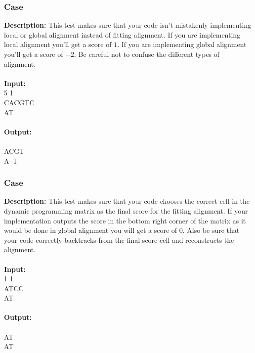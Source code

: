 \documentclass{article}
\newcommand{\code}[1]{{\fontfamily{pcr}\selectfont #1}}
\begin{document}
\subsubsection*{Case }
\hline \vspace{5}
\textbf{Description:} This test makes sure that your code isn’t mistakenly implementing local or global alignment instead of fitting alignment. If you are implementing local alignment you’ll get a score of $1$. If you are implementing global alignment you’ll get a score of $-2$. Be careful not to confuse the different types of alignment.\\ \\
\noindent \textbf{Input:}\\
\code{1 5 1\\CACGTC\\AT}\\ \\
\noindent \textbf{Output:}\\
\code{0\\ACGT\\A--T}

\subsubsection*{Case }
\hline \vspace{5}
\textbf{Description:} This test makes sure that your code chooses the correct cell in the dynamic programming matrix as the final score for the fitting alignment. If your implementation outputs the score in the bottom right corner of the matrix as it would be done in global alignment you will get a score of $0$. Also be sure that your code correctly backtracks from the final score cell and reconstructs the alignment.\\ \\
\noindent \textbf{Input:}\\
\code{1 1 1\\ATCC\\AT}\\ \\
\noindent \textbf{Output:}\\
\code{2\\AT\\AT}
\pagebreak
\end{document}
